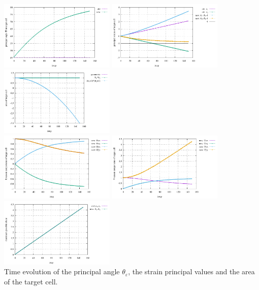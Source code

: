 \begin{center}
\includegraphics[width=5.5cm]{python_codes/fieldstone_89/results/shearband/principal_angle.pdf}
\includegraphics[width=5.5cm]{python_codes/fieldstone_89/results/shearband/principal_strains.pdf}
\includegraphics[width=5.5cm]{python_codes/fieldstone_89/results/shearband/area.pdf}\\
\includegraphics[width=5.5cm]{python_codes/fieldstone_89/results/shearband/R.pdf}
\includegraphics[width=5.5cm]{python_codes/fieldstone_89/results/shearband/V.pdf}
\includegraphics[width=5.5cm]{python_codes/fieldstone_89/results/shearband/maximum_shear.pdf}\\
{\captionfont Time evolution of the principal angle $\theta_\varepsilon$, 
the strain principal values and the area of the target cell.}
\end{center}











